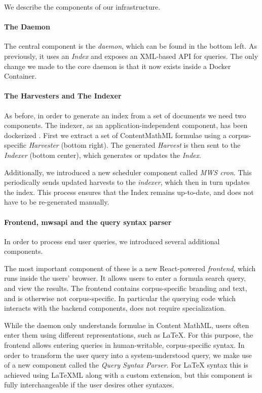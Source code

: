 We describe the components of our infrastructure. 

\paragraph{The \MWS Daemon}
The central component is the \textit{\MWS daemon}, which can be found in the bottom left. 
As previously, it uses an \textit{Index} and exposes an XML-based API for queries. 
The only change we made to the core daemon is that it now exists inside a Docker Container. 

\paragraph{The Harvesters and The Indexer}
As before, in order to generate an index from a set of documents we need two components. 
The indexer, as an application-independent component, has been dockerized . 
First we extract a set of ContentMathML formulae using a corpus-specific \textit{Harvester} (bottom right). 
The generated \textit{Harvest} is then sent to the \textit{Indexer} (bottom center), which generates or updates the \textit{Index}. 

Additionally, we introduced a new scheduler component called \textit{MWS cron}. 
This periodically sends updated harvests to the \textit{indexer}, which then in turn updates the index. 
This process ensures that the Index remains up-to-date, and does not have to be re-generated manually. 

\paragraph{Frontend, mwsapi and the query syntax parser}

In order to process end user queries, we introduced several additional components.

The most important component of these is a new React-powered \textit{frontend}, which runs inside the users' browser. 
It allows users to enter a formula search query, and view the results. 
The frontend contains corpus-specific branding and text, and is otherwise not corpus-specific. 
In particular the querying code which interacts with the backend components, does not require specialization. 

While the \MWS daemon only understands formulae in Content MathML, users often enter them using different representations, such as \LaTeX. 
For this purpose, the frontend allows entering queries in human-writable, corpus-specific syntax. 
In order to transform the user query into a system-understood query, we make use of a new component called the \textit{Query Syntax Parser}. 
For {\LaTeX} syntax this is achieved using {\LaTeX}ML along with a custom \MWS extension, but this component is fully interchangeable if the user desires other syntaxes. 

